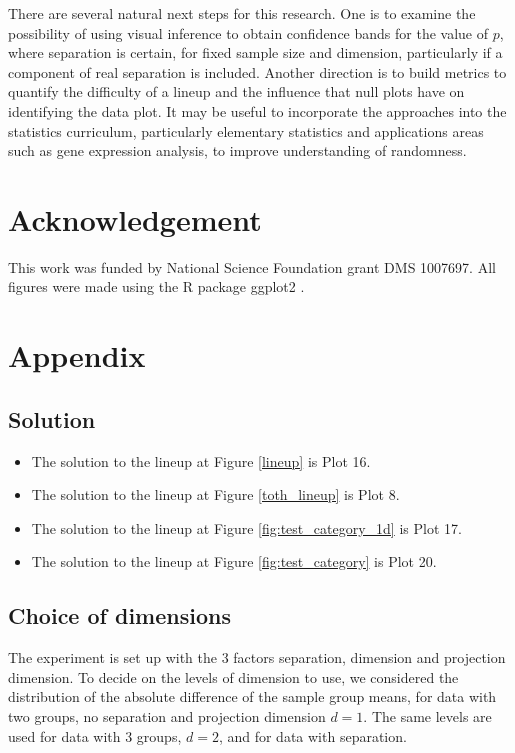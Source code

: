 There are several natural next steps for this research. One is to examine the possibility of using visual inference to obtain confidence bands for the value of $p$, where separation is certain, for fixed sample size and dimension, particularly if a component of real separation is included. Another direction is to build metrics to quantify the difficulty of a lineup and the influence that null plots have on identifying the data plot. It may be useful to incorporate the approaches into the statistics curriculum, particularly elementary statistics and applications areas such as gene expression analysis, to improve understanding of randomness. 



\section*{Acknowledgement}
%
This work was funded by National Science Foundation grant DMS 1007697. All figures were made using the R \citep{r} package ggplot2 \citep{hadley:2009}.

\section*{Appendix}

\subsection*{Solution}
\begin{itemize}
\item The solution to the lineup at Figure \ref{lineup} is Plot 16. 
\item The solution to the lineup at Figure \ref{toth_lineup} is Plot 8.
\item The solution to the lineup at Figure \ref{fig:test_category_1d} is Plot 17.
\item The solution to the lineup at Figure \ref{fig:test_category} is Plot 20.

\end{itemize}

\subsection*{Choice of dimensions} \label{sec:theory}

The experiment is set up with the 3 factors separation, dimension and projection dimension. To decide on the levels of dimension to use, we considered the distribution of the absolute difference of the sample group means, for data with two groups, no separation and projection dimension $d=1$. The same levels are used for data with 3 groups, $d=2$, and for data with separation. 

